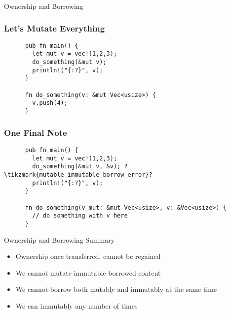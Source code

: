 \begin{section}{Ownership and Borrowing}
  \begin{frame}[fragile]
    \frametitle{Let's Mutate Everything}
    \begin{verbatim}
      pub fn main() {
        let mut v = vec!(1,2,3);
        do_something(&mut v);
        println!("{:?}", v);
      }

      fn do_something(v: &mut Vec<usize>) {
        v.push(4);
      }
    \end{verbatim}
  \end{frame}

  \begin{frame}[fragile]
    \frametitle{One Final Note}
    \begin{verbatim}
      pub fn main() {
        let mut v = vec!(1,2,3);
        do_something(&mut v, &v); ?\tikzmark{mutable_immutable_borrow_error}?
        println!("{:?}", v);
      }

      fn do_something(v_mut: &mut Vec<usize>, v: &Vec<usize>) {
        // do something with v here
      }
    \end{verbatim}
  \end{frame}

  \begin{frame}{Ownership and Borrowing Summary}
    \begin{itemize}
    \item Ownership once transferred, cannot be regained
    \item We cannot mutate immutable borrowed content
    \item We cannot borrow both mutably and immutably at the same time
    \item We can immutably any number of times
    \end{itemize}
  \end{frame}

\end{section}
